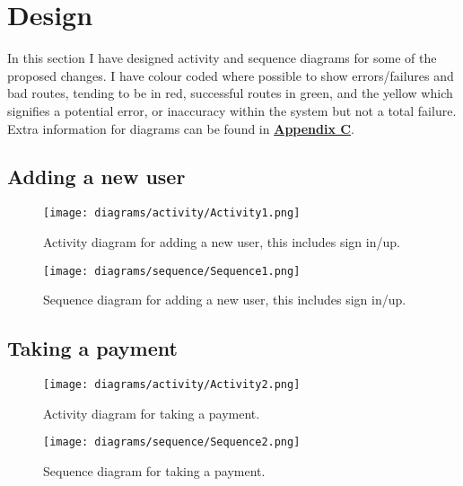 \section{Design}
  In this section I have designed activity and sequence diagrams for some of the proposed changes. I have colour coded where possible to show
  errors/failures and bad routes, tending to be in red, successful routes in green, and the yellow which signifies a potential error, or
  inaccuracy within the system but not a total failure. Extra information for diagrams can be found in \hyperref[sec:AppendixC]{\textbf{Appendix C}}.

  \subsection{Adding a new user}

    \begin{figure}[H]
      \centering
      \texttt{[image: diagrams/activity/Activity1.png]}
      \caption{Activity diagram for adding a new user, this includes sign in/up.}
      \label{fig:newUserActivity}
    \end{figure}

    \begin{figure}[H]
      \centering
      \texttt{[image: diagrams/sequence/Sequence1.png]}
      \caption{Sequence diagram for adding a new user, this includes sign in/up.}
      \label{fig:newUserSequence}
    \end{figure}
  
  \newpage
  
  \subsection{Taking a payment}
  \label{sec:design:payment}
  
    \begin{figure}[H]
      \centering
      \texttt{[image: diagrams/activity/Activity2.png]}
      \caption{Activity diagram for taking a payment.}
      \label{fig:takePaymentActivity}
    \end{figure}

    \begin{figure}[H]
      \centering
      \texttt{[image: diagrams/sequence/Sequence2.png]}
      \caption{Sequence diagram for taking a payment.}
      \label{fig:takePaymentSequence}
    \end{figure}

  \newpage

